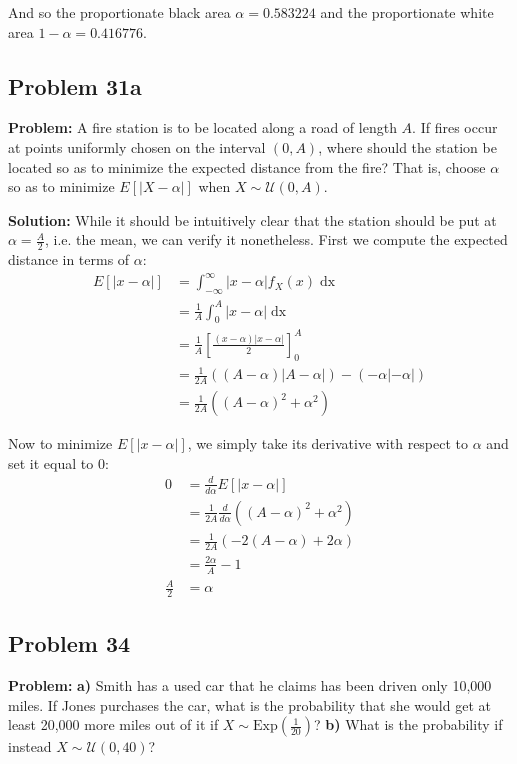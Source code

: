 \documentclass{article}
\newcommand*\eval[3]{\left[#1\right]_{#2}^{#3}}
\begin{document}
And so the proportionate black area $\alpha=0.583224$ and the proportionate white area $1-\alpha=0.416776$.

\subsection*{Problem 31a}
\noindent\textbf{Problem:} A fire station is to be located along a road of length $A$. If fires occur at points uniformly chosen on the interval $(0,A)$, where should the station be located so as to minimize the expected distance from the fire? That is, choose $\alpha$ so as to minimize $E[|X-\alpha|]$ when $X\sim \mathcal U(0,A)$. 
\bigskip

\noindent\textbf{Solution:} While it should be intuitively clear that the station should be put at $\alpha=\frac{A}{2}$, i.e. the mean, we can verify it nonetheless. First we compute the expected distance in terms of $\alpha$:
\begin{align*}
    E[|x-\alpha|]&=\int_{-\infty}^{\infty} |x-\alpha|f_X(x)\mathop{dx}\tag{def. of expected value}\\
    &=\frac{1}{A}\int_0^A |x-\alpha|\mathop{dx}\tag{pdf of uniform distribution}\\
    &=\frac{1}{A}\eval{\frac{(x-\alpha)|x-\alpha|}{2}}{0}{A}\tag{integral of $|\cdot|$}\\
    &=\frac{1}{2A}\left((A-\alpha)|A-\alpha|\right)-\left(-\alpha|-\alpha|\right)\\
    &=\frac{1}{2A}((A-\alpha)^2+\alpha^2)\tag{$A\ge\alpha\ge0$}
\end{align*}

Now to minimize $E[|x-\alpha|]$, we simply take its derivative with respect to $\alpha$ and set it equal to 0:
\begin{align*}
    0&=\frac{d}{d\alpha}E[|x-\alpha|]\\
    &=\frac{1}{2A}\frac{d}{d\alpha}((A-\alpha)^2+\alpha^2)\\
    &=\frac{1}{2A}(-2(A-\alpha)+2\alpha)\\
    &=\frac{2\alpha}{A}-1\\
    \frac{A}{2}&=\alpha
\end{align*}

\subsection*{Problem 34}
\noindent\textbf{Problem:} \textbf{a)} Smith has a used car that he claims has been driven only 10,000 miles. If Jones purchases the car, what is the probability that she would get at least 20,000 more miles out of it if $X\sim\text{Exp}\left(\frac{1}{20}\right)$? \textbf{b)} What is the probability if instead $X\sim\mathcal U(0,40)$?
\bigskip
\end{document}
